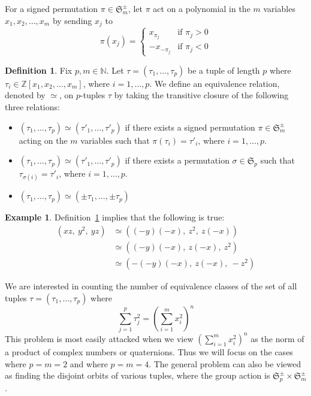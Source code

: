 \documentclass[12pt]{article}
\theoremstyle{definition}
\newtheorem{definition}[theorem]{Definition}
\newtheorem{example}[theorem]{Example}
\newcommand{\Nnn}{\mathbb N}
\newcommand{\Zzz}{\mathbb Z}
\numberwithin{equation}{section}
\begin{document}

For a signed permutation \( \pi \in \mathfrak{S}_m^\pm \), let \( \pi \) act on a polynomial in the 
\(m\) variables \( x_1,x_2, \ldots, x_m \) by sending \( x_j \) to 
\[
\pi(x_j) =
\begin{cases}
x_{\pi_j} & \text{if } \pi_j > 0 \\
-x_{-\pi_j} & \text{if } \pi_j < 0
\end{cases}
\]

\begin{definition}
\label{def:general}
Fix \( p, m \in \Nnn \). 
Let \( \tau = ( \tau_1, \ldots, \tau_p) \)
be a tuple of length \( p \) where 
\( \tau_i \in \Zzz[x_1,x_2, \ldots, x_m] \), where \( i = 1, \ldots, p \).
We define an equivalence relation, denoted by \( \simeq \), on \(p\)-tuples
\( \tau \) 
by taking the transitive closure of the following three relations:
\begin{itemize}
\item
\( ( \tau_1, \ldots, \tau_p) \simeq ( \tau'_1, \ldots, \tau'_p) \)
if there exists a signed permutation \( \pi \in \mathfrak{S}_m^\pm \)
acting on the \( m \) variables such that \( \pi( \tau_i ) = \tau'_i \),
 where \( i = 1, \ldots, p \).
\item
\( ( \tau_1, \ldots, \tau_p) \simeq ( \tau'_1, \ldots, \tau'_p) \)
if there exists a permutation \( \sigma \in \mathfrak{S}_p \)
such that \( \tau_{\sigma(i)} = \tau'_i \), where \( i = 1, \ldots, p \).
\item
\( ( \tau_1, \ldots, \tau_p) \simeq ( \pm \tau_1, \ldots, \pm \tau_p) \)
\end{itemize}
\end{definition}


\begin{example}
Definition~\ref{def:general} implies that the following is true:
\begin{align*}
( xz,\: y^2,\: yz )  
&\simeq ( (-y)(-x),\: z^2,\: z(-x) ) \\
&\simeq ( (-y)(-x),\: z(-x),\: z^2 ) \\
&\simeq ( -(-y)(-x),\: z(-x),\: -z^2 ) 
\end{align*}
\end{example}



We are interested in counting the number of
equivalence classes of the set of all tuples
 \( \tau = ( \tau_1, \ldots, \tau_p) \)
where
\[
\sum_{j = 1}^{p}  \tau_j ^ 2  
= 
\left( \sum_{i = 1}^{m}  x_i ^ 2  \right) ^ n 
\] 
This problem is most easily attacked when we
view \( \left( \sum_{i = 1}^{m}  x_i ^ 2  \right) ^ n \)
as the norm of a product of complex numbers or quaternions.
Thus we will focus on the cases where \( p = m = 2 \) and where \( p = m = 4 \).
The general problem can also be viewed as finding the disjoint orbits of 
various tuples, where the group action is \( \mathfrak{S}_p^\pm \times \mathfrak{S}_m^\pm \).
\end{document}

